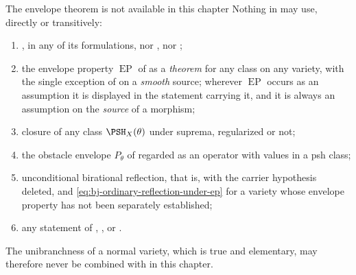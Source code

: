 \begin{warning}{The envelope theorem is not available in this chapter}
\label{warn:ch42-firewall}
Nothing in  may use, directly or transitively:
\begin{enumerate}
\item {}, in any of its formulations, nor
      , nor
      ;
\item the envelope property $\operatorname{EP}$ of
       as a \emph{theorem} for any class on
      any variety, with the single exception of
       on a \emph{smooth} source; wherever
      $\operatorname{EP}$ occurs as an assumption it is displayed in the
      statement carrying it, and it is always an assumption on the
      \emph{source} of a morphism;
\item closure of any class $\PSH_X(\theta)$ under suprema, regularized or
      not;
\item the obstacle envelope $P_\theta$ of
       regarded as an operator with values in
      a psh class;
\item unconditional birational reflection, that is,
       with the carrier hypothesis deleted,
      and \eqref{eq:bj-ordinary-reflection-under-ep} for a variety whose
      envelope property has not been separately established;
\item any statement of ,
      , or
      .
\end{enumerate}
The unibranchness of a normal variety, which is true and elementary, may
therefore never be combined with  in this
chapter.
\end{warning}

